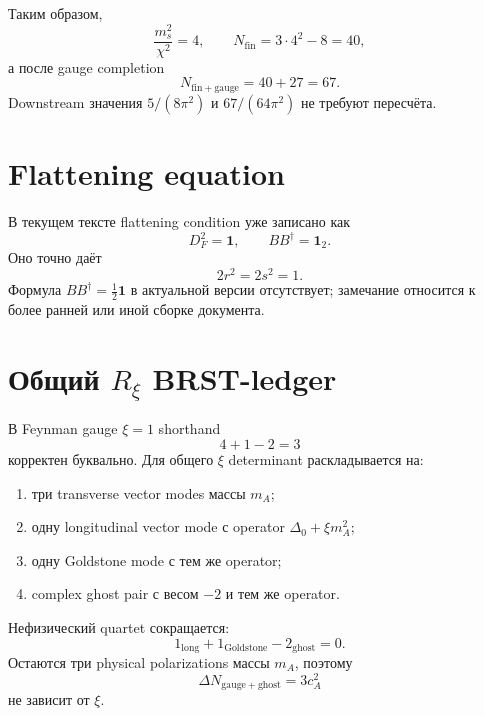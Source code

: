 Таким образом,
\begin{equation}
 \frac{m_s^2}{\chi^2}=4,
 \qquad
 N_{\mathrm{fin}}=3\cdot4^2-8=40,
\end{equation}
а после gauge completion
\begin{equation}
 N_{\mathrm{fin+gauge}}=40+27=67.
\end{equation}
Downstream значения \(5/(8\pi^2)\) и \(67/(64\pi^2)\) не требуют
пересчёта.

\section{Flattening equation}

В текущем тексте flattening condition уже записано как
\begin{equation}
 D_F^2=\mathbf1,
 \qquad
 BB^\dagger=\mathbf1_2.
\end{equation}
Оно точно даёт
\begin{equation}
 2r^2=2s^2=1.
\end{equation}
Формула \(BB^\dagger=\frac12\mathbf1\) в актуальной версии отсутствует;
замечание относится к более ранней или иной сборке документа.

\section{Общий \(R_\xi\) BRST-ledger}

В Feynman gauge \(\xi=1\) shorthand
\begin{equation}
 4+1-2=3
\end{equation}
корректен буквально. Для общего \(\xi\) determinant раскладывается на:
\begin{enumerate}
 \item три transverse vector modes массы \(m_A\);
 \item одну longitudinal vector mode с operator
 \(\Delta_0+\xi m_A^2\);
 \item одну Goldstone mode с тем же operator;
 \item complex ghost pair с весом \(-2\) и тем же operator.
\end{enumerate}
Нефизический quartet сокращается:
\begin{equation}
 1_{\mathrm{long}}
 +1_{\mathrm{Goldstone}}
 -2_{\mathrm{ghost}}
 =0.
\end{equation}
Остаются три physical polarizations массы \(m_A\), поэтому
\begin{equation}
 \Delta N_{\mathrm{gauge+ghost}}=3c_A^2
\end{equation}
не зависит от \(\xi\).

